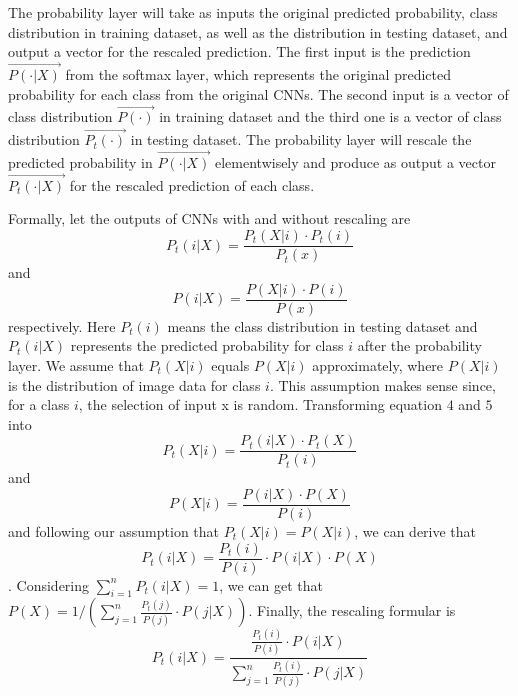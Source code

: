 \documentclass{article}
\begin{document}
The probability layer will take as inputs the original predicted probability, class distribution in training dataset, as well as the distribution in testing dataset, and output a vector for the rescaled prediction. The first input is the prediction $\vec{P(\cdot|X)}$ from the softmax layer, which represents the original predicted probability for each class from the original CNNs. The second input is a vector of class distribution $\vec{P(\cdot)}$ in training dataset and the third one is a vector of class distribution $\vec{P_t(\cdot)}$ in testing dataset. The probability layer will rescale the predicted probability in $\vec{P(\cdot|X)}$ elementwisely and produce as output a vector $\vec{P_t(\cdot|X)}$ for the rescaled prediction of each class.

Formally, let the outputs of CNNs with and without rescaling are
\begin{equation}
    P_t(i|X) = \frac{P_t(X|i) \cdot P_t(i)}{P_t(x)}
\end{equation}
and
\begin{equation}
    P(i|X) = \frac{P(X|i) \cdot P(i)}{P(x)}
\end{equation}
respectively. Here $P_t(i)$ means the class distribution in testing dataset and $P_t(i|X)$ represents the predicted probability for class $i$ after the probability layer. We assume that $P_t(X|i)$ equals $P(X|i)$ approximately, where $P(X|i)$ is the distribution of image data for class $i$. This assumption makes sense since, for a class $i$, the selection of input x is random. Transforming equation $4$ and $5$ into 
\begin{equation}
    P_t(X|i) = \frac{P_t(i|X) \cdot P_t(X)}{P_t(i)}
\end{equation}
and
\begin{equation}
    P(X|i) = \frac{P(i|X) \cdot P(X)}{P(i)}
\end{equation}
and following our assumption that $P_t(X|i) = P(X|i)$, we can derive that 
\begin{equation}
    P_t(i|X) = \frac{P_t(i)}{P(i)}\cdot P(i|X) \cdot P(X) 
\end{equation}. Considering $\sum_{i=1}^n P_t(i|X) = 1$, we can get that $P(X) = 1/(\sum_{j=1}^{n} \frac{P_t(j)}{P(j)} \cdot P(j|X))$. Finally, the rescaling formular is 
\begin{equation}
    P_t(i|X) = \frac{\frac{P_t(i)}{P(i)} \cdot P(i|X)}{\sum_{j=1}^n \frac{P_t(i)}{P(j)} \cdot P(j|X)}
\end{equation}
\end{document}
